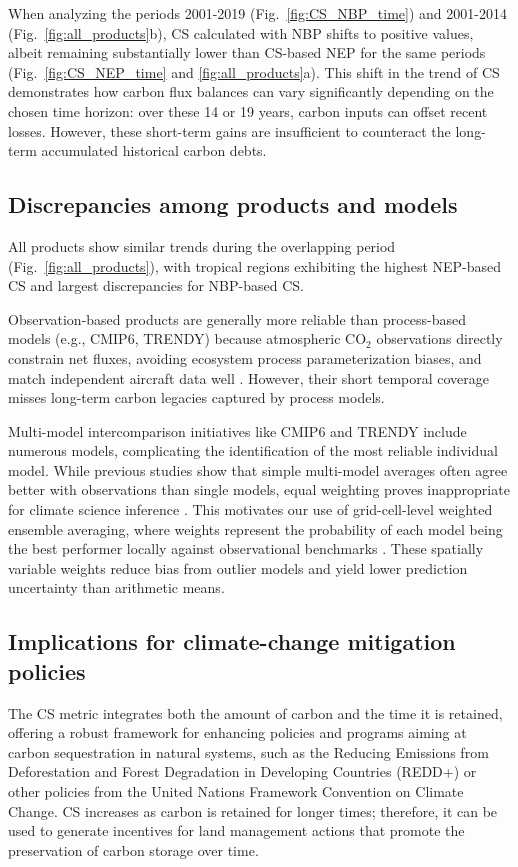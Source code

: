 \documentclass[ProofPDF]{./Styles/Jnls-Template-V3}
\begin{document}
When analyzing the periods 2001-2019 (Fig.~\ref{fig:CS_NBP_time}) and 2001-2014 (Fig.~\ref{fig:all_products}b), CS calculated with NBP shifts to positive values, albeit remaining substantially lower than CS-based NEP for the same periods (Fig.~\ref{fig:CS_NEP_time} and \ref{fig:all_products}a). This shift in the trend of CS demonstrates how carbon flux balances can vary significantly depending on the chosen time horizon: over these 14 or 19 years, carbon inputs can offset recent losses. However, these short-term gains are insufficient to counteract the long-term accumulated historical carbon debts. 


\subsection{Discrepancies among products and models}
All products show similar trends during the overlapping period (Fig.~\ref{fig:all_products}), with tropical regions exhibiting the highest NEP-based CS and largest discrepancies for NBP-based CS.

Observation-based products are generally more reliable than process-based models (e.g., CMIP6, TRENDY) because atmospheric CO$_2$ observations directly constrain net fluxes, avoiding ecosystem process parameterization biases, and match independent aircraft data well \citep{Gaubert2019,Woude2025}. However, their short temporal coverage misses long-term carbon legacies captured by process models.

Multi-model intercomparison initiatives like CMIP6 and TRENDY include numerous models, complicating the identification of the most reliable individual model. While previous studies show that simple multi-model averages often agree better with observations than single models, equal weighting proves inappropriate for climate science inference \citep{Hagedorn2005,Knutti2017}. This motivates our use of grid-cell-level weighted ensemble averaging, where weights represent the probability of each model being the best performer locally against observational benchmarks \citep{Sierra2025GDM}. These spatially variable weights reduce bias from outlier models and yield lower prediction uncertainty than arithmetic means.


\subsection{Implications for climate-change mitigation policies}

The CS metric integrates both the amount of carbon and the time it is retained, offering a robust framework for enhancing policies and programs aiming at carbon sequestration in natural systems, such as the Reducing Emissions from Deforestation and Forest Degradation in Developing Countries (REDD+) or other policies from the United Nations Framework Convention on Climate Change. CS increases as carbon is retained for longer times; therefore, it can be used to generate incentives for land management actions that promote the preservation of carbon storage over time. 
\end{document}
